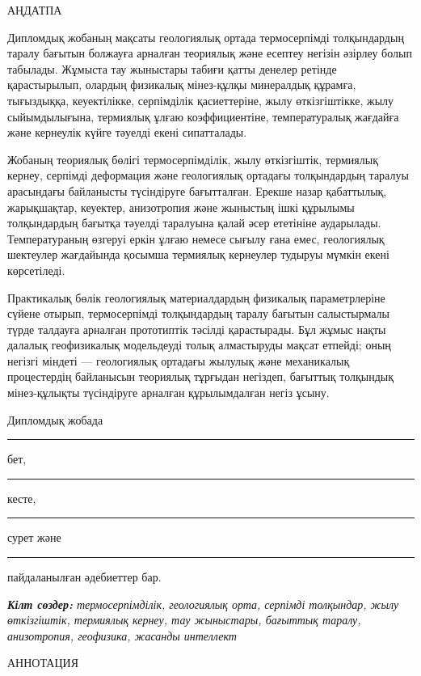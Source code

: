 % 
% 

\clearpage
\thispagestyle{empty}

\begin{center}
{\Large АҢДАТПА}
\end{center}

Дипломдық жобаның мақсаты геологиялық ортада термосерпімді толқындардың таралу бағытын болжауға арналған теориялық және есептеу негізін әзірлеу болып табылады. Жұмыста тау жыныстары табиғи қатты денелер ретінде қарастырылып, олардың физикалық мінез-құлқы минералдық құрамға, тығыздыққа, кеуектілікке, серпімділік қасиеттеріне, жылу өткізгіштікке, жылу сыйымдылығына, термиялық ұлғаю коэффициентіне, температуралық жағдайға және кернеулік күйге тәуелді екені сипатталады.

Жобаның теориялық бөлігі термосерпімділік, жылу өткізгіштік, термиялық кернеу, серпімді деформация және геологиялық ортадағы толқындардың таралуы арасындағы байланысты түсіндіруге бағытталған. Ерекше назар қабаттылық, жарықшақтар, кеуектер, анизотропия және жыныстың ішкі құрылымы толқындардың бағытқа тәуелді таралуына қалай әсер ететініне аударылады. Температураның өзгеруі еркін ұлғаю немесе сығылу ғана емес, геологиялық шектеулер жағдайында қосымша термиялық кернеулер тудыруы мүмкін екені көрсетіледі.

Практикалық бөлік геологиялық материалдардың физикалық параметрлеріне сүйене отырып, термосерпімді толқындардың таралу бағытын салыстырмалы түрде талдауға арналған прототиптік тәсілді қарастырады. Бұл жұмыс нақты далалық геофизикалық модельдеуді толық алмастыруды мақсат етпейді; оның негізгі міндеті — геологиялық ортадағы жылулық және механикалық процестердің байланысын теориялық тұрғыдан негіздеп, бағыттық толқындық мінез-құлықты түсіндіруге арналған құрылымдалған негіз ұсыну.

Дипломдық жобада \rule{1cm}{0.1pt} бет, \rule{1cm}{0.1pt} кесте, \rule{1cm}{0.1pt} сурет және \rule{1cm}{0.1pt} пайдаланылған әдебиеттер бар.

\vspace{5mm}
\noindent\textit{\textbf{Кілт сөздер:} термосерпімділік, геологиялық орта, серпімді толқындар, жылу өткізгіштік, термиялық кернеу, тау жыныстары, бағыттық таралу, анизотропия, геофизика, жасанды интеллект}

\clearpage
\thispagestyle{empty}

\begin{center}
{\Large АННОТАЦИЯ}
\end{center}

